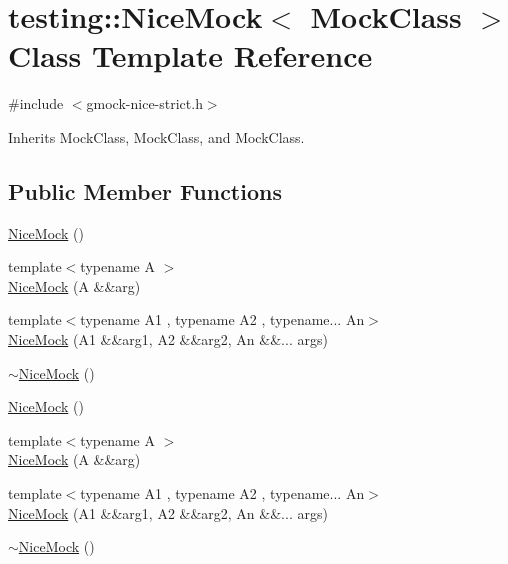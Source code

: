 \hypertarget{classtesting_1_1_nice_mock}{}\section{testing\+::Nice\+Mock$<$ Mock\+Class $>$ Class Template Reference}
\label{classtesting_1_1_nice_mock}


{\ttfamily \#include $<$gmock-\/nice-\/strict.\+h$>$}



Inherits Mock\+Class, Mock\+Class, and Mock\+Class.

\subsection*{Public Member Functions}
\begin{DoxyCompactItemize}
\item 
\mbox{\hyperlink{classtesting_1_1_nice_mock_a10bbd6ebe779ac8ab1f9f3ae2dee9310}{Nice\+Mock}} ()
\item 
{\footnotesize template$<$typename A $>$ }\\\mbox{\hyperlink{classtesting_1_1_nice_mock_a63f2d3b2af1c725036df39367c90fe6d}{Nice\+Mock}} (A \&\&arg)
\item 
{\footnotesize template$<$typename A1 , typename A2 , typename... An$>$ }\\\mbox{\hyperlink{classtesting_1_1_nice_mock_a8d9f38b501fbbf1179f139451d29dd78}{Nice\+Mock}} (A1 \&\&arg1, A2 \&\&arg2, An \&\&... args)
\item 
\mbox{\hyperlink{classtesting_1_1_nice_mock_a30be5e5e20248f31c8390cd88fa74d7f}{$\sim$\+Nice\+Mock}} ()
\item 
\mbox{\hyperlink{classtesting_1_1_nice_mock_a10bbd6ebe779ac8ab1f9f3ae2dee9310}{Nice\+Mock}} ()
\item 
{\footnotesize template$<$typename A $>$ }\\\mbox{\hyperlink{classtesting_1_1_nice_mock_a63f2d3b2af1c725036df39367c90fe6d}{Nice\+Mock}} (A \&\&arg)
\item 
{\footnotesize template$<$typename A1 , typename A2 , typename... An$>$ }\\\mbox{\hyperlink{classtesting_1_1_nice_mock_a8d9f38b501fbbf1179f139451d29dd78}{Nice\+Mock}} (A1 \&\&arg1, A2 \&\&arg2, An \&\&... args)
\item 
\mbox{\hyperlink{classtesting_1_1_nice_mock_a30be5e5e20248f31c8390cd88fa74d7f}{$\sim$\+Nice\+Mock}} ()
\item 

\end{DoxyCompactItemize}

